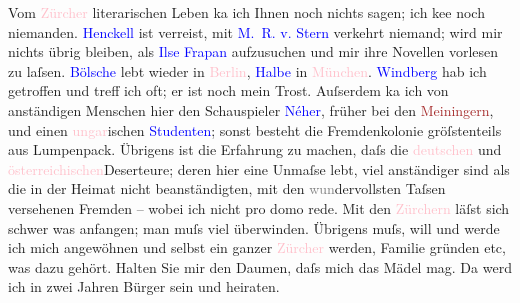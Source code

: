            \pstart
           Vom \textcolor{pink}{Zürcher}{}\ledrightnote{\textcolor{pink}{Zürich}} literarischen Leben ka{\geminationn} ich Ihnen noch nichts sagen; ich ke{\geminationn}e noch niemanden. \textcolor{blue}{Henckell}{}\ledrightnote{\textcolor{blue}{Karl Friedrich Henckell}} ist verreist, mit \textcolor{blue}{M. R. v.
                        Stern}{}\ledrightnote{\textcolor{blue}{Maurice Reinhold Stern}} verkehrt niemand; wird mir nichts übrig bleiben, als \textcolor{blue}{Ilse Frapan}{}\ledrightnote{\textcolor{blue}{Ilse Frapan}} aufzusuchen und mir ihre
                    Novellen vorlesen zu laſsen. \textcolor{blue}{Bölsche}{}\ledrightnote{\textcolor{blue}{Wilhelm Bölsche}} lebt
                    wieder in \textcolor{pink}{Berlin}{}\ledrightnote{\textcolor{pink}{Berlin}}, \textcolor{blue}{Halbe}{}\ledrightnote{\textcolor{blue}{Max Halbe}} in \textcolor{pink}{München}{}\ledrightnote{\textcolor{pink}{München}}. \textcolor{blue}{Windberg}{}\ledrightnote{\textcolor{blue}{Windberg}} hab ich getroffen und treff ich
                    oft; er ist noch mein Trost. Auſserdem ka{\geminationn} ich von
                    anständigen Menschen hier den Schauspieler \textcolor{blue}{Néher}{}\ledrightnote{\textcolor{blue}{Louis Neher}}, früher bei den \textcolor{brown}{Meiningern}{}\ledrightnote{\textcolor{brown}{Meininger}}, und
                    einen \textcolor{pink}{ungar}{}\ledrightnote{\textcolor{pink}{Ungarn}}ischen \textcolor{blue}{Studenten}{}; sonst besteht die
                    Fremdenkolonie gröſstenteils aus Lumpenpack. Übrigens ist die Erfahrung zu
                    machen, daſs die \textcolor{pink}{deutschen}{}\ledrightnote{\textcolor{pink}{Deutschland}} und \textcolor{pink}{österreichischen}{}\ledrightnote{\textcolor{pink}{Österreich}}{ }{\pb}Deserteure; deren hier eine Unmaſse
                    lebt, viel anständiger sind als die in der Heimat nicht beanständigten, mit den
                        \textcolor{gray}{wun}dervollsten Taſsen versehenen Fremden – wobei ich
                    nicht pro domo rede. Mit den \textcolor{pink}{Zürchern}{}\ledrightnote{\textcolor{pink}{Zürich}} läſst
                    sich schwer was anfangen; man muſs viel überwinden. Übrigens muſs, will und
                    werde ich mich angewöhnen und selbst ein ganzer \textcolor{pink}{Zürcher}{}\ledrightnote{\textcolor{pink}{Zürich}} werden, Familie gründen etc, was dazu gehört. Halten Sie mir
                    den Daumen, daſs mich das Mädel mag. Da{\geminationn} werd ich
                    in zwei Jahren Bürger \introOben{}sein\introOben{} und heiraten.\pend
